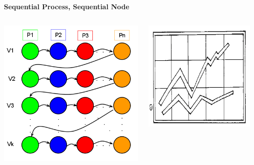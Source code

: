 \documentclass[final]{beamer}
\begin{document}
\begin{frame}[t]
\begin{columns}[t]
\begin{column}{0.60\paperwidth}
\begin{columns}[t,totalwidth=0.60\paperwidth]
					\begin{column}{0.28\paperwidth}
						\begin{center} \bf{Sequential Process, Sequential Node} \end{center}
						\begin{columns}[t,totalwidth=0.28\paperwidth]
							\begin{column}{0.12\paperwidth}
								\begin{center} \includegraphics[width=0.12\paperwidth]{img/linked_list/seq_proc_seq_node} \end{center}
							\end{column}
							\begin{column}{0.12\paperwidth}
								\begin{center} \includegraphics[width=0.12\paperwidth]{img/temp} \end{center}

\end{column}
\end{columns}
\end{column}
\end{columns}
\end{column}
\end{columns}
\end{frame}
\end{document}
